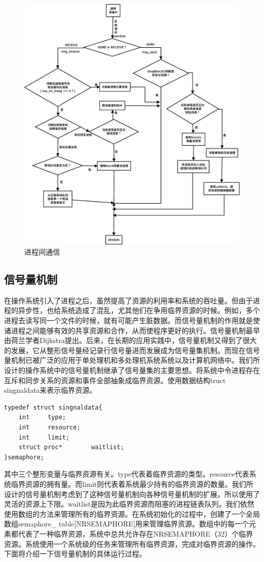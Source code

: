\documentclass[UTF8,nofonts,cs4size]{ctexrep}
\begin{document}
\begin{figure}[htp]
\centering
\includegraphics[scale=0.34]{sendrecv.eps}
\caption{进程间通信}
\label{sendrecv}
\end{figure}
\subsection{信号量机制}
在操作系统引入了进程之后，虽然提高了资源的利用率和系统的吞吐量。但由于进程的异步性，也给系统造成了混乱，尤其他们在争用临界资源的时候。例如，多个进程去读写同一个文件的时候，就有可能产生脏数据。而信号量机制的作用就是使诸进程之间能够有效的共享资源和合作，从而使程序更好的执行。信号量机制最早由荷兰学者Dijkstra提出。后来，在长期的应用实践中，信号量机制又得到了很大的发展，它从整形信号量经记录行信号量进而发展成为信号量集机制。而现在信号量机制已被广泛的应用于单处理机和多处理机系统系统以及计算机网络中。我们所设计的操作系统中的信号量机制继承了信号量集的主要思想。将系统中令进程存在互斥和同步关系的资源和事件全部抽象成临界资源。使用数据结构truct singnaldata来表示临界资源。
\begin{lstlisting}
typedef struct singnaldata{
	int		type;
	int		resource;
	int		limit;
    struct proc*		waitlist;
}semaphore;
\end{lstlisting}
其中三个整形变量与临界资源有关。type代表着临界资源的类型。resource代表系统临界资源的拥有量。而limit则代表着系统最少持有的临界资源的数量。我们所设计的信号量机制考虑到了这种信号量机制向各种信号量机制的扩展。所以使用了灵活的资源上下限。waitlist是因为此临界资源而阻塞的进程链表队列。我们依然使用数组的方法来管理所有的临界资源。在系统初始化的过程中，创建了一个全局数组semaphore\_ table[NRSEMAPHORE]用来管理临界资源。数组中的每一个元素都代表了一种临界资源，系统中总共允许存在NRSEMAPHORE（32）个临界资源。系统使用一个系统级的任务来管理所有临界资源，完成对临界资源的操作。下面将介绍一下信号量机制的具体运行过程。
\end{document}
